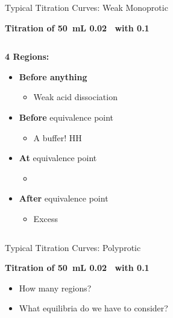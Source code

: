 \documentclass[notes=hide]{beamer}
\begin{document}
\begin{frame}[t]{Typical Titration Curves: Weak Monoprotic}
	\begin{center}
		\bfseries
		Titration of \SI{50}{\milli\liter}
		\SI{0.02}{\Molar}~ with
		\SI{0.1}{\Molar}~
	\end{center}

	\begin{columns}[t]
		
		\begin{block}{\bfseries 4 Regions:}
			\begin{itemize}
				\item \textbf{Before anything}
					\begin{itemize}
						\item<2-> Weak acid dissociation
					\end{itemize}
				\item \textbf{Before} equivalence point
					\begin{itemize}
						\item<3-> A buffer! \alert{HH}
					\end{itemize}
				\item \textbf{At} equivalence point
					\begin{itemize}
						\item<4-> \ch{[NaOH] = [HA]}
					\end{itemize}
				\item \textbf{After} equivalence point
					\begin{itemize}
						\item<5-> Excess 
					\end{itemize}
			\end{itemize}
		\end{block}
	\end{columns}
\end{frame}


\begin{frame}[t]{Typical Titration Curves: Polyprotic}
	\begin{center}
		\bfseries
		Titration of \SI{50}{\milli\liter} \SI{0.02}{\Molar}~
		with \SI{0.1}{\Molar}~
	\end{center}
	
	\begin{itemize}[<only@+>]
		\item How many regions? %
		\item What equilibria do we have to consider?
	\end{itemize}
\end{frame}
\end{document}
